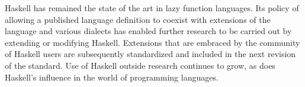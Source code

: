 Haskell has remained the state of the art in lazy function languages. Its policy of allowing a published language definition to coexist with extensions of the language and various dialects has enabled further research to be carried out by extending or modifying Haskell. Extensions that are embraced by the community of Haskell users are subsequently standardized and included in the next revision of the standard. Use of Haskell outside research continues to grow, as does Haskell's influence in the world of programming languages.
